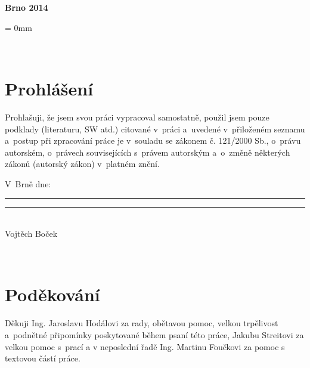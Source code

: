 \documentclass[12pt, a4paper, oneside]{article}
\newcommand{\B}{\textbf} %
\begin{document}
\vspace{20mm}

\begin{center}
\B{Brno 2014}

\end{center}
\normalsize
\newpage  %
\voffset = 0mm %

~ %

\vspace{10mm}

\section*{Prohlášení}

Prohlašuji, že jsem svou práci vypracoval samostatně, použil jsem pouze podklady (literaturu, SW atd.) citované v~práci a~uvedené v~přiloženém seznamu a~postup při zpracování práce je v~souladu se zákonem č. 121/2000 Sb., o~právu autorském, o~právech souvisejících s~právem autorským a~o~změně některých zákonů (autorský zákon) v~platném znění.

\vspace{10mm}

\noindent \parbox{\textwidth}{
\noindent V~Brně dne: \rule{4cm}{1pt}
\hfill\parbox{5cm}{
    \centering
    \vspace{9mm}
    \rule{5cm}{1pt}\\
        Vojtěch Boček
}
}
 

\newpage   %

~ %
\vspace{150mm}

\section*{Poděkování}
Děkuji Ing. Jaroslavu Hodálovi za rady, obětavou pomoc, velkou trpělivost a~podnětné připomínky poskytované během psaní této práce, Jakubu \mbox{Streitovi} za velkou pomoc s~prací a v neposlední řadě Ing. Martinu Foučkovi za pomoc s textovou částí práce.
 

\newpage   %
~ %
\vspace{-20mm}
\end{document}
